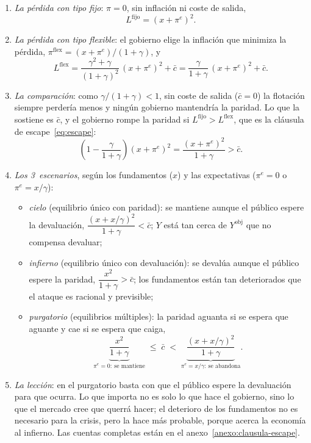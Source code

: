\documentclass[11pt]{article}
\begin{document}
\begin{anotaciones}
\begin{enumerate}
\item \emph{La pérdida con tipo fijo}: $\pi=0$, sin inflación ni coste de salida,
  \[
  L^{\mathrm{fijo}}=(x+\pi^e)^2 .
  \]
\item \emph{La pérdida con tipo flexible}: el gobierno elige la inflación que minimiza la pérdida, $\pi^{\mathrm{flex}}=(x+\pi^e)/(1+\gamma)$, y
  \[
  L^{\mathrm{flex}}=\frac{\gamma^2+\gamma}{(1+\gamma)^2}\,(x+\pi^e)^2+\bar c=\frac{\gamma}{1+\gamma}\,(x+\pi^e)^2+\bar c .
  \]
\item \emph{La comparación}: como $\gamma/(1+\gamma)<1$, sin coste de salida ($\bar c=0$) la flotación siempre perdería menos y ningún gobierno mantendría la paridad. Lo que la sostiene es $\bar c$, y el gobierno rompe la paridad si $L^{\mathrm{fijo}}>L^{\mathrm{flex}}$, que es la cláusula de escape~\eqref{eq:escape}:
  \[
  \left(1-\frac{\gamma}{1+\gamma}\right)(x+\pi^e)^2=\frac{(x+\pi^e)^2}{1+\gamma}>\bar c .
  \]
\item \emph{Los 3~escenarios}, según los fundamentos ($x$) y las expectativas ($\pi^e=0$ o $\pi^e=x/\gamma$):
  \begin{itemize}
  \item \emph{cielo} (equilibrio único con paridad): se mantiene aunque el público espere la devaluación, $\dfrac{(x+x/\gamma)^2}{1+\gamma}<\bar c$; $Y$ está tan cerca de $Y^{\mathrm{obj}}$ que no compensa devaluar;
  \item \emph{infierno} (equilibrio único con devaluación): se devalúa aunque el público espere la paridad, $\dfrac{x^2}{1+\gamma}>\bar c$; los fundamentos están tan deteriorados que el ataque es racional y previsible;
  \item \emph{purgatorio} (equilibrios múltiples): la paridad aguanta si se espera que aguante y cae si se espera que caiga,
    \[
    \underbrace{\frac{x^2}{1+\gamma}}_{\pi^e=0:\ \text{se mantiene}}\;\le\;\bar c\;<\;\underbrace{\frac{(x+x/\gamma)^2}{1+\gamma}}_{\pi^e=x/\gamma:\ \text{se abandona}} .
    \]
  \end{itemize}
\item \emph{La lección}: en el purgatorio basta con que el público espere la devaluación para que ocurra. Lo que importa no es solo lo que hace el gobierno, sino lo que el mercado cree que querrá hacer; el deterioro de los fundamentos no es necesario para la crisis, pero la hace más probable, porque acerca la economía al infierno. Las cuentas completas están en el anexo~\ref{anexo:clausula-escape}.
\end{enumerate}
\end{anotaciones}
\end{document}
